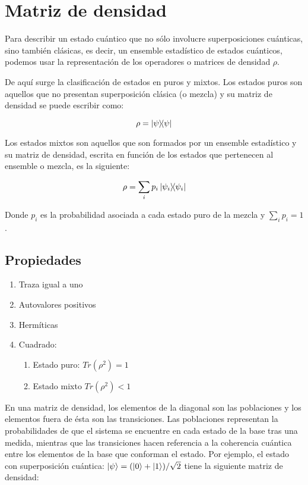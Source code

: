 \section{Matriz de densidad}

Para describir un estado cuántico que no sólo involucre superposiciones cuánticas, sino también clásicas, es decir, un ensemble estadístico de estados cuánticos, podemos usar la representación de los operadores o matrices de densidad $\rho$.

De aquí surge la clasificación de estados en puros y mixtos. Los estados puros son aquellos que no presentan superposición clásica (o mezcla) y su matriz de densidad se puede escribir como:

\begin{equation}
    \rho = \ketbra{\psi}{\psi}
\end{equation}

Los estados mixtos son aquellos que son formados por un ensemble estadístico y su matriz de densidad, escrita en función de los estados que pertenecen al ensemble o mezcla, es la siguiente:

\begin{equation}
    \rho = \sum_i p_i \ketbra{\psi_i}{\psi_i}
\end{equation}

Donde $p_i$ es la probabilidad asociada a cada estado puro de la mezcla y $\sum_i p_i = 1$.

\subsection{Propiedades}

\begin{enumerate}
    \item Traza igual a uno
    \item Autovalores positivos
    \item Hermíticas
    \item Cuadrado:
        \begin{enumerate}
            \item Estado puro: $Tr(\rho^2) = 1$
            \item Estado mixto $Tr(\rho^2) < 1$
        \end{enumerate}
\end{enumerate}

En una matriz de densidad, los elementos de la diagonal son las poblaciones y los elementos fuera de ésta son las transiciones. Las poblaciones representan la probabilidades de que el sistema se encuentre en cada estado de la base tras una medida, mientras que las transiciones hacen referencia a la coherencia cuántica entre los elementos de la base que conforman el estado. Por ejemplo, el estado con superposición cuántica: $\ket{\psi} = (\ket{0} + \ket{1})/\sqrt{2}$ tiene la siguiente matriz de densidad:

